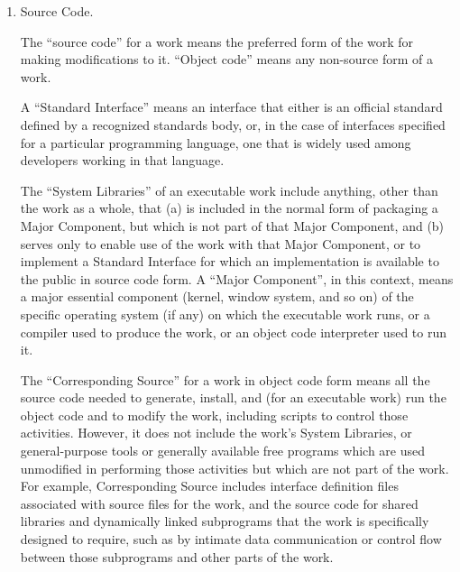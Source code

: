 \documentclass[10pt,a4paper,ngerman,titlepage,tocindentauto]{article}
\begin{document}
\begin{multicols}{3}
{\begin{enumerate}
					To ``convey'' a work means any kind of propagation that enables other
					parties to make or receive copies.  Mere interaction with a user through
					a computer network, with no transfer of a copy, is not conveying.

					An interactive user interface displays ``Appropriate Legal Notices''
					to the extent that it includes a convenient and prominently visible
					feature that (1) displays an appropriate copyright notice, and (2)
					tells the user that there is no warranty for the work (except to the
					extent that warranties are provided), that licensees may convey the
					work under this License, and how to view a copy of this License.  If
					the interface presents a list of user commands or options, such as a
					menu, a prominent item in the list meets this criterion.

					\item Source Code.

					The ``source code'' for a work means the preferred form of the work
					for making modifications to it.  ``Object code'' means any non-source
					form of a work.

					A ``Standard Interface'' means an interface that either is an official
					standard defined by a recognized standards body, or, in the case of
					interfaces specified for a particular programming language, one that
					is widely used among developers working in that language.

					The ``System Libraries'' of an executable work include anything, other
					than the work as a whole, that (a) is included in the normal form of
					packaging a Major Component, but which is not part of that Major
					Component, and (b) serves only to enable use of the work with that
					Major Component, or to implement a Standard Interface for which an
					implementation is available to the public in source code form.  A
					``Major Component'', in this context, means a major essential component
					(kernel, window system, and so on) of the specific operating system
					(if any) on which the executable work runs, or a compiler used to
					produce the work, or an object code interpreter used to run it.

					The ``Corresponding Source'' for a work in object code form means all
					the source code needed to generate, install, and (for an executable
					work) run the object code and to modify the work, including scripts to
					control those activities.  However, it does not include the work's
					System Libraries, or general-purpose tools or generally available free
					programs which are used unmodified in performing those activities but
					which are not part of the work.  For example, Corresponding Source
					includes interface definition files associated with source files for
					the work, and the source code for shared libraries and dynamically
					linked subprograms that the work is specifically designed to require,
					such as by intimate data communication or control flow between those
					subprograms and other parts of the work.


\end{enumerate}}
\end{multicols}
\end{document}
